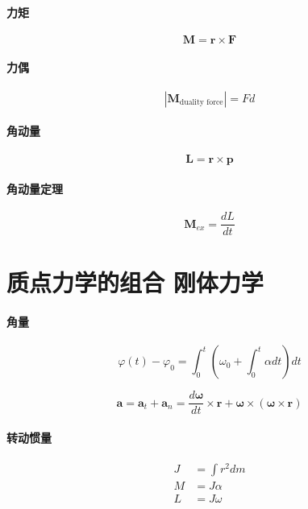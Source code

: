 \documentclass[12pt,a4paper]{article}
\numberwithin{equation}{section}
\begin{document}
\begin{CJK}{UTF8}{gbsn}
\paragraph{力矩}
\begin{equation}
  \bm{M}=\bm{r}\times\bm{F}
\end{equation}
\paragraph{力偶}
\begin{equation}
  |\bm{M}_{\textrm{duality force}}|=Fd
\end{equation}
\paragraph{角动量}
\begin{equation}
  \bm{L}=\bm{r}\times\bm{p}
\end{equation}
\paragraph{角动量定理}
\begin{equation}
  \bm{M}_{ex}=\frac{dL}{dt}
\end{equation}

\section{质点力学的组合 刚体力学}

\paragraph{角量}
\begin{equation}
  \varphi(t)-\varphi_0=\int_0^t \left( \omega_0 + \int_0^t \alpha dt \right)dt
\end{equation}

\begin{equation}
  \bm{a}=\bm{a}_t+\bm{a}_n=\frac{d\bm{\omega}}{dt}\times \bm{r}+\bm{\omega}\times(\bm{\omega}\times\bm{r})
\end{equation}

\paragraph{转动惯量}
\begin{align}
  J&=\int r^2 dm \\
  M&=J\alpha \\
  L&=J\omega
\end{align}



\end{CJK}
\end{document}
